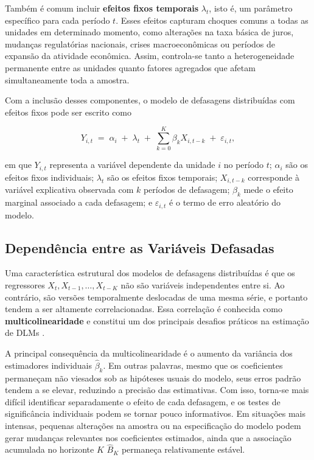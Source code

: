 Também é comum incluir \textbf{efeitos fixos temporais} $\lambda_t$, isto é, um
parâmetro específico para cada período $t$. Esses efeitos capturam choques comuns
a todas as unidades em determinado momento, como alterações na taxa básica de juros,
mudanças regulatórias nacionais, crises macroeconômicas ou períodos de expansão da
atividade econômica. Assim, controla-se tanto a heterogeneidade permanente entre as
unidades quanto fatores agregados que afetam simultaneamente toda a amostra.

Com a inclusão desses componentes, o modelo de defasagens distribuídas com efeitos
fixos pode ser escrito como

\begin{equation}
    Y_{i,t} \;=\; \alpha_i \;+\; \lambda_t \;+\;
    \sum_{k=0}^{K} \beta_k X_{i,t-k} \;+\; \varepsilon_{i,t},
    \label{eq:dlm_ef}
\end{equation}

\noindent em que $Y_{i,t}$ representa a variável dependente da unidade $i$ no
período $t$; $\alpha_i$ são os efeitos fixos individuais; $\lambda_t$ são os
efeitos fixos temporais; $X_{i,t-k}$ corresponde à variável explicativa observada
com $k$ períodos de defasagem; $\beta_k$ mede o efeito marginal associado a cada
defasagem; e $\varepsilon_{i,t}$ é o termo de erro aleatório do modelo.

\subsection{Dependência entre as Variáveis Defasadas}

Uma característica estrutural dos modelos de defasagens distribuídas é que os regressores
$X_t, X_{t-1}, \ldots, X_{t-K}$ não são variáveis independentes entre si. Ao contrário,
são versões temporalmente deslocadas de uma mesma série, e portanto tendem a ser altamente
correlacionadas. Essa correlação é conhecida como \textbf{multicolinearidade} e constitui
um dos principais desafios práticos na estimação de DLMs \citep{judge1985}.

A principal consequência da multicolinearidade é o aumento da variância dos
estimadores individuais $\hat{\beta}_k$. Em outras palavras, mesmo que os
coeficientes permaneçam não viesados sob as hipóteses usuais do modelo, seus erros
padrão tendem a se elevar, reduzindo a precisão das estimativas. Com isso, torna-se
mais difícil identificar separadamente o efeito de cada defasagem, e os testes de
significância individuais podem se tornar pouco informativos. Em situações mais
intensas, pequenas alterações na amostra ou na especificação do modelo podem gerar
mudanças relevantes nos coeficientes estimados, ainda que a associação acumulada no
horizonte $K$ $\hat{B}_K$ permaneça relativamente estável.

